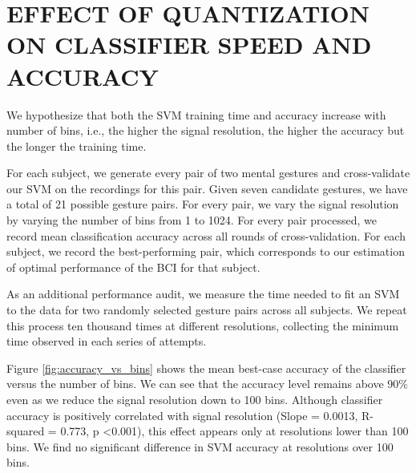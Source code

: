 \section{\uppercase{Effect of quantization on classifier speed and accuracy}}
\label{sec:quantization_eval}


We hypothesize that both the SVM training time and accuracy increase with number of bins, i.e., the higher the signal resolution, the higher the accuracy but the longer the training time.



For each subject, we generate every pair of two mental gestures and cross-validate our SVM on the recordings for this pair. Given seven candidate gestures, we have a total of 21 possible gesture pairs. For every pair, we vary the signal resolution by varying the number of bins from 1 to 1024. For every pair processed, we record mean classification accuracy across all rounds of cross-validation. For each subject, we record the best-performing pair, which corresponds to our estimation of optimal performance of the BCI for that subject.

As an additional performance audit, we measure the time needed to fit an SVM to the data for two randomly selected gesture pairs across all subjects. We repeat this process ten thousand times at different resolutions, collecting the minimum time observed in each series of attempts.


Figure \ref{fig:accuracy_vs_bins} shows the mean best-case accuracy of the classifier versus the number of bins. We can see that the accuracy level remains above 90\% even as we reduce the signal resolution down to 100 bins. Although classifier accuracy is positively correlated with signal resolution (Slope = 0.0013, R-squared = 0.773, p \textless 0.001), this effect appears only at resolutions lower than 100 bins. We find no significant difference in SVM accuracy at resolutions over 100 bins.

